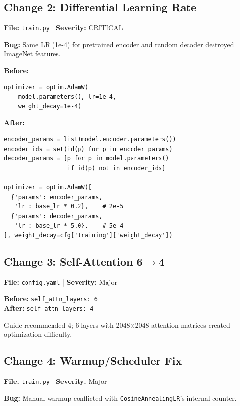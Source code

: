 \documentclass[10pt,twocolumn,letterpaper]{article}
\begin{document}
\subsection{Change 2: Differential Learning Rate}
\textbf{File:} \texttt{train.py} | \textbf{Severity:} \textcolor{bugred}{CRITICAL}

\textbf{Bug:} Same LR (1e-4) for pretrained encoder and random decoder destroyed ImageNet features.

\textbf{Before:}
\begin{lstlisting}
optimizer = optim.AdamW(
    model.parameters(), lr=1e-4,
    weight_decay=1e-4)
\end{lstlisting}

\textbf{After:}
\begin{lstlisting}
encoder_params = list(model.encoder.parameters())
encoder_ids = set(id(p) for p in encoder_params)
decoder_params = [p for p in model.parameters()
                  if id(p) not in encoder_ids]

optimizer = optim.AdamW([
  {'params': encoder_params,
   'lr': base_lr * 0.2},    # 2e-5
  {'params': decoder_params,
   'lr': base_lr * 5.0},    # 5e-4
], weight_decay=cfg['training']['weight_decay'])
\end{lstlisting}

\subsection{Change 3: Self-Attention 6$\to$4}
\textbf{File:} \texttt{config.yaml} | \textbf{Severity:} Major

\textbf{Before:} \texttt{self\_attn\_layers: 6} \\
\textbf{After:} \texttt{self\_attn\_layers: 4}

Guide recommended 4; 6 layers with 2048$\times$2048 attention matrices created optimization difficulty.

\subsection{Change 4: Warmup/Scheduler Fix}
\textbf{File:} \texttt{train.py} | \textbf{Severity:} Major

\textbf{Bug:} Manual warmup conflicted with \texttt{CosineAnnealingLR}'s internal counter.
\end{document}
